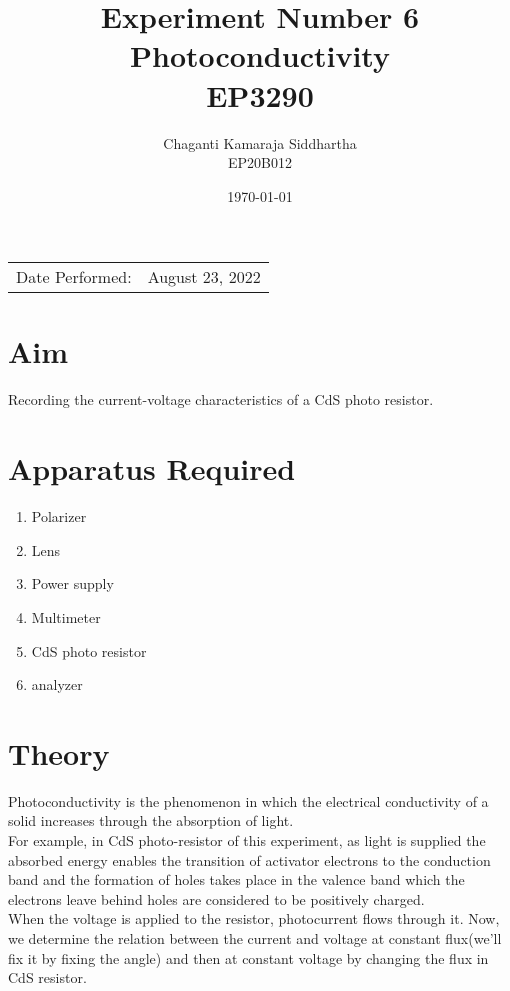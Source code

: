 \documentclass[
	letterpaper, %
	10pt, %
]{CSUniSchoolLabReport}
\title{Experiment Number 6\\Photoconductivity\\ EP3290} %
\author{Chaganti Kamaraja Siddhartha\\EP20B012} %
\date{\today} %
\begin{document}
\maketitle %

\begin{center}
	\begin{tabular}{l r}
		Date Performed: & August 23, 2022 \\ %
	\end{tabular}
\end{center}


\section{Aim}
Recording the current-voltage characteristics of a CdS photo resistor. 
\section{Apparatus Required}
\begin{enumerate}
	\item Polarizer
	\item Lens
	\item Power supply
	\item Multimeter
	\item CdS photo resistor
	\item analyzer
\end{enumerate}
\section{Theory}
Photoconductivity is the phenomenon in which the electrical conductivity of a solid increases through the absorption of light.\\
For example, in CdS photo-resistor of this experiment, as light is supplied the absorbed energy enables the transition of activator electrons to the conduction band and the formation of holes takes place in the valence band which the electrons leave behind holes are considered to be positively charged. \\
When the voltage is applied to the resistor, photocurrent flows through it. Now, we determine the relation between the current and voltage at constant flux(we'll fix it by fixing the angle) and then at constant voltage by changing the flux in CdS resistor. 
\newpage
\end{document}

